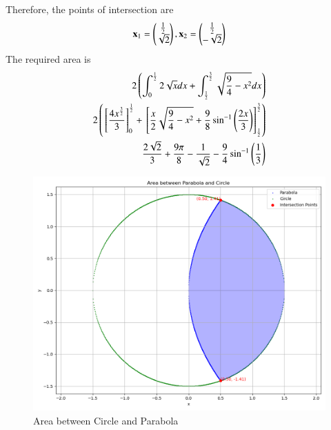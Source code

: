 \documentclass[journal]{IEEEtran}
\begin{document}
Therefore, the points of intersection are
\begin{align}
   \mathbf{x}_1 = \begin{pmatrix}\frac{1}{2} \\ \sqrt{2}\end{pmatrix}, \mathbf{x}_2 = \begin{pmatrix}\frac{1}{2} \\ -\sqrt{2}\end{pmatrix}
   \end{align}
The required area is
\begin{align}
	2\left(\int_{0}^{\frac{1}{2}}2\sqrt{x}dx + \int_{\frac{1}{2}}^{\frac{3}{2}}\sqrt{\frac{9}{4} - x^2}dx\right) \\
	2\left({}\left[\frac{4x^{\frac{3}{2}}}{3}\right]_0^{\frac{1}{2}} + {}\left[\frac{x}{2}\sqrt{\frac{9}{4} - x^2} + \frac{9}{8}\sin^{-1}{\left(\frac{2x}{3}\right)}\right]_{\frac{1}{2}}^\frac{3}{2}\right) \\
    \frac{2\sqrt{2}}{3} + \frac{9\pi}{8} - \frac{1}{\sqrt{2}} - \frac{9}{4}\sin^{-1}\left(\frac{1}{3}\right)
\end{align}
\begin{figure}[h!]
   \centering
   \includegraphics[width=0.7\linewidth]{figs/area.png}
	\caption{Area between Circle and Parabola}
   \end{figure}
\end{document}
